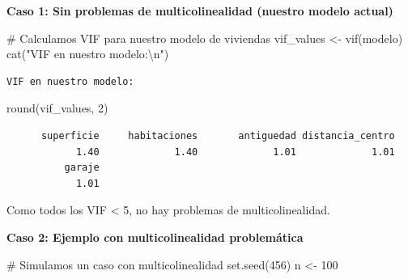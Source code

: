 \documentclass[
  letterpaper,
  DIV=11,
  numbers=noendperiod]{scrreprt}
\newenvironment{Shaded}{\begin{snugshade}}{\end{snugshade}}
\newcommand{\CommentTok}[1]{\textcolor[rgb]{0.37,0.37,0.37}{#1}}
\newcommand{\DecValTok}[1]{\textcolor[rgb]{0.68,0.00,0.00}{#1}}
\newcommand{\FunctionTok}[1]{\textcolor[rgb]{0.28,0.35,0.67}{#1}}
\newcommand{\NormalTok}[1]{\textcolor[rgb]{0.00,0.23,0.31}{#1}}
\newcommand{\OtherTok}[1]{\textcolor[rgb]{0.00,0.23,0.31}{#1}}
\newcommand{\SpecialCharTok}[1]{\textcolor[rgb]{0.37,0.37,0.37}{#1}}
\newcommand{\StringTok}[1]{\textcolor[rgb]{0.13,0.47,0.30}{#1}}
\begin{document}
\begin{tcolorbox}[enhanced jigsaw, breakable, toprule=.15mm, bottomtitle=1mm, coltitle=black, colbacktitle=quarto-callout-tip-color!10!white, titlerule=0mm, opacitybacktitle=0.6, bottomrule=.15mm, toptitle=1mm, title=\textcolor{quarto-callout-tip-color}{\faLightbulb}\hspace{0.5em}{Ejemplo: Diagnóstico de multicolinealidad}, arc=.35mm, rightrule=.15mm, opacityback=0, colframe=quarto-callout-tip-color-frame, leftrule=.75mm, left=2mm, colback=white]

\textbf{Caso 1: Sin problemas de multicolinealidad (nuestro modelo
actual)}

\begin{Shaded}
\begin{Highlighting}[]
\CommentTok{\# Calculamos VIF para nuestro modelo de viviendas}
\NormalTok{vif\_values }\OtherTok{\textless{}{-}} \FunctionTok{vif}\NormalTok{(modelo)}
\FunctionTok{cat}\NormalTok{(}\StringTok{"VIF en nuestro modelo:}\SpecialCharTok{\textbackslash{}n}\StringTok{"}\NormalTok{)}
\end{Highlighting}
\end{Shaded}

\begin{verbatim}
VIF en nuestro modelo:
\end{verbatim}

\begin{Shaded}
\begin{Highlighting}[]
\FunctionTok{round}\NormalTok{(vif\_values, }\DecValTok{2}\NormalTok{)}
\end{Highlighting}
\end{Shaded}

\begin{verbatim}
      superficie     habitaciones       antiguedad distancia_centro 
            1.40             1.40             1.01             1.01 
          garaje 
            1.01 
\end{verbatim}

Como todos los VIF \textless{} 5, no hay problemas de multicolinealidad.

\textbf{Caso 2: Ejemplo con multicolinealidad problemática}

\begin{Shaded}
\begin{Highlighting}[]
\CommentTok{\# Simulamos un caso con multicolinealidad}
\FunctionTok{set.seed}\NormalTok{(}\DecValTok{456}\NormalTok{)}
\NormalTok{n }\OtherTok{\textless{}{-}} \DecValTok{100}


\end{Highlighting}
\end{Shaded}
\end{tcolorbox}
\end{document}
